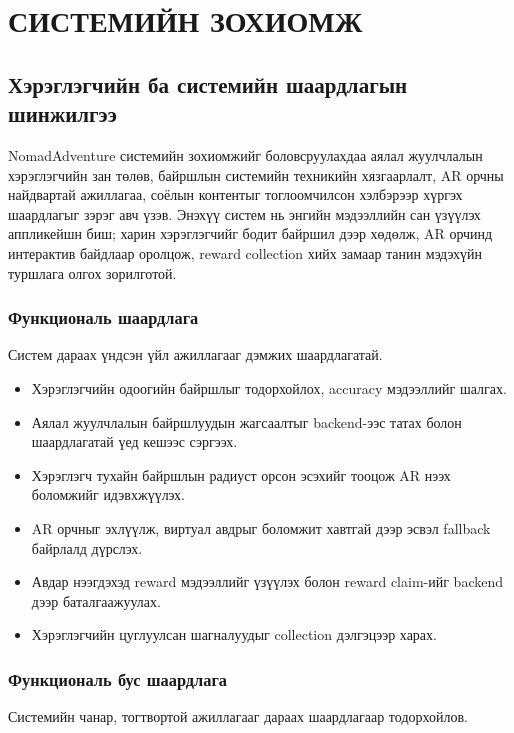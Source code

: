 \chapter{СИСТЕМИЙН ЗОХИОМЖ}
\begin{sloppy}

\section{Хэрэглэгчийн ба системийн шаардлагын шинжилгээ}

NomadAdventure системийн зохиомжийг боловсруулахдаа аялал жуулчлалын хэрэглэгчийн зан төлөв, байршлын системийн техникийн хязгаарлалт, AR орчны найдвартай ажиллагаа, соёлын контентыг тоглоомчилсон хэлбэрээр хүргэх шаардлагыг зэрэг авч үзэв. Энэхүү систем нь энгийн мэдээллийн сан үзүүлэх аппликейшн биш; харин хэрэглэгчийг бодит байршил дээр хөдөлж, AR орчинд интерактив байдлаар оролцож, reward collection хийх замаар танин мэдэхүйн туршлага олгох зорилготой.

\subsection{Функциональ шаардлага}

Систем дараах үндсэн үйл ажиллагааг дэмжих шаардлагатай.

\begin{itemize}
    \item Хэрэглэгчийн одоогийн байршлыг тодорхойлох, accuracy мэдээллийг шалгах.
    \item Аялал жуулчлалын байршлуудын жагсаалтыг backend-ээс татах болон шаардлагатай үед кешээс сэргээх.
    \item Хэрэглэгч тухайн байршлын радиуст орсон эсэхийг тооцож AR нээх боломжийг идэвхжүүлэх.
    \item AR орчныг эхлүүлж, виртуал авдрыг боломжит хавтгай дээр эсвэл fallback байрлалд дүрслэх.
    \item Авдар нээгдэхэд reward мэдээллийг үзүүлэх болон reward claim-ийг backend дээр баталгаажуулах.
    \item Хэрэглэгчийн цуглуулсан шагналуудыг collection дэлгэцээр харах.
\end{itemize}

\subsection{Функциональ бус шаардлага}

Системийн чанар, тогтвортой ажиллагааг дараах шаардлагаар тодорхойлов.


\end{sloppy}

